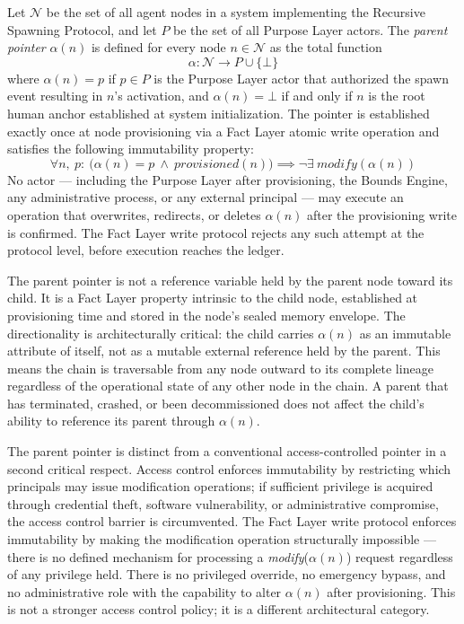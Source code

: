 \begin{dfn}\label{dfn:parent-pointer}
Let $\mathcal{N}$ be the set of all agent nodes in a \bxthree{} system implementing the Recursive Spawning Protocol, and let $P$ be the set of all Purpose Layer actors. The \emph{parent pointer} $\alpha(n)$ is defined for every node $n \in \mathcal{N}$ as the total function
\begin{equation}
\alpha : \mathcal{N} \rightarrow P \cup \{\bot\}
\label{eq:alpha-function}
\end{equation}
where $\alpha(n) = p$ if $p \in P$ is the Purpose Layer actor that authorized the spawn event resulting in $n$'s activation, and $\alpha(n) = \bot$ if and only if $n$ is the root human anchor established at system initialization. The pointer is established exactly once at node provisioning via a Fact Layer atomic write operation and satisfies the following immutability property:
\begin{equation}
\forall n,\ p:\ \bigl(\alpha(n) = p \ \land \ \textit{provisioned}(n)\bigr) \implies \neg\exists\ \textit{modify}(\alpha(n))
\label{eq:parent-pointer-immutable}
\end{equation}
No actor --- including the Purpose Layer after provisioning, the Bounds Engine, any administrative process, or any external principal --- may execute an operation that overwrites, redirects, or deletes $\alpha(n)$ after the provisioning write is confirmed. The Fact Layer write protocol rejects any such attempt at the protocol level, before execution reaches the ledger.
\end{dfn}

The parent pointer is not a reference variable held by the parent node toward its child. It is a Fact Layer property intrinsic to the child node, established at provisioning time and stored in the node's sealed memory envelope. The directionality is architecturally critical: the child carries $\alpha(n)$ as an immutable attribute of itself, not as a mutable external reference held by the parent. This means the chain is traversable from any node outward to its complete lineage regardless of the operational state of any other node in the chain. A parent that has terminated, crashed, or been decommissioned does not affect the child's ability to reference its parent through $\alpha(n)$.

The parent pointer is distinct from a conventional access-controlled pointer in a second critical respect. Access control enforces immutability by restricting which principals may issue modification operations; if sufficient privilege is acquired through credential theft, software vulnerability, or administrative compromise, the access control barrier is circumvented. The Fact Layer write protocol enforces immutability by making the modification operation structurally impossible --- there is no defined mechanism for processing a \textit{modify}($\alpha(n)$) request regardless of any privilege held. There is no privileged override, no emergency bypass, and no administrative role with the capability to alter $\alpha(n)$ after provisioning. This is not a stronger access control policy; it is a different architectural category.


